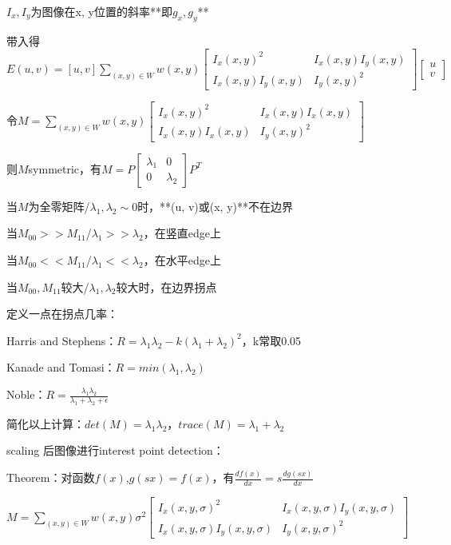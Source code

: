 \documentclass[UTF8]{ctexart}
\begin{document}
  \quad \quad \quad $I_x, I_y$为图像在x, y位置的斜率**即$g_x, g_y$**

  \quad \quad 带入得$E(u, v) = [u, v]\sum_{(x, y) \in W}w(x, y)
    \begin{bmatrix}
      I_x(x, y)^2 & I_x(x, y)I_y(x, y) \\
      I_x(x, y)I_y(x, y) & I_y(x, y)^2
      \end{bmatrix}
    \begin{bmatrix}
      u \\ 
      v
      \end{bmatrix}$

  \quad \quad 令$M = \sum_{(x, y) \in W}w(x, y)
    \begin{bmatrix}
      I_x(x, y)^2 & I_x(x, y)I_x(x, y) \\
      I_x(x, y)I_x(x, y) & I_y(x, y)^2
      \end{bmatrix}$

  \quad \quad 则$M$symmetric，有$M = P 
    \begin{bmatrix}
      \lambda_1 & 0 \\
      0 & \lambda_2
      \end{bmatrix} P^T$

  \quad \quad \quad 当$M$为全零矩阵/$\lambda_1,\lambda_2 \sim 0$时，**(u, v)或(x, y)**不在边界

  \quad \quad \quad 当$M_{00} >> M_{11}$/$\lambda_1 >> \lambda_2$，在竖直edge上

  \quad \quad \quad 当$M_{00} << M_{11}$/$\lambda_1 << \lambda_2$，在水平edge上

  \quad \quad \quad 当$M_{00}, M_{11}$较大/$\lambda_1, \lambda_2$较大时，在边界拐点

  \quad 定义一点在拐点几率：

  \quad \quad Harris and Stephens：$R = \lambda_1\lambda_2 - k(\lambda_1 + \lambda_2)^2$，k常取0.05

  \quad \quad Kanade and Tomasi：$R = min(\lambda_1, \lambda_2)$

  \quad \quad Noble：$R = \frac{\lambda_1\lambda_2}{\lambda_1 + \lambda_2 + \epsilon}$

  \quad \quad 简化以上计算：$det(M) = \lambda_1\lambda_2$，$trace(M) = \lambda_1 + \lambda_2$

  scaling 后图像进行interest point detection：

  \quad Theorem：对函数$f(x)$,$g(sx) = f(x)$，有$\frac{df(x)}{dx} = s\frac{dg(sx)}{dx}$

  \quad $M = \sum_{(x, y) \in W}w(x, y)\sigma^2
    \begin{bmatrix}
      I_x(x, y, \sigma)^2 & I_x(x, y, \sigma)I_y(x, y, \sigma) \\
      I_x(x, y, \sigma)I_y(x, y, \sigma) & I_y(x, y, \sigma)^2
      \end{bmatrix}$
\end{document}

